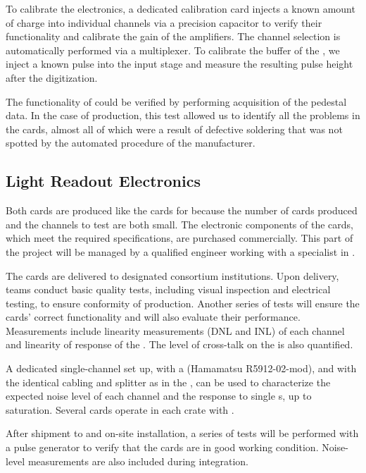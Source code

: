 To calibrate the   electronics, a dedicated calibration card %
injects  a known amount of charge into individual  channels via a precision capacitor to verify their functionality and calibrate the gain of the amplifiers. The channel selection is automatically performed via a multiplexer. To calibrate the  buffer of the  , we inject a known pulse into the input stage and measure the resulting pulse height after the digitization. 



The functionality of  could be verified by performing acquisition of the pedestal data. In the case of  production, this test allowed us to identify all the problems in the cards, almost all of which%
were a result of defective soldering that was not spotted by the automated  procedure of the manufacturer. 


\subsection{Light Readout Electronics}
\label{ssec:dp-tpcelec-prod-lro}

Both   cards are produced like the cards for  because the number of cards produced and the channels to test are both small. The electronic components of the cards, which meet the required specifications, are purchased commercially. This part of the project will be managed by a qualified engineer working with a specialist in .

The cards are delivered to designated consortium institutions. Upon delivery, teams conduct basic quality tests, including visual inspection and electrical testing, to ensure conformity of production. Another series of tests will ensure the cards' %
correct %
functionality and will also evaluate their performance. Measurements include linearity measurements (DNL and INL) of each  channel and linearity of response of the . The level of cross-talk on the  is also quantified. 

A dedicated single-channel set up, with a  (Hamamatsu R5912-02-mod), and with the identical cabling and splitter as in the , 
can be used to characterize the expected noise level of each channel and the response to single \phel{}s, up to saturation. 
Several cards operate in each  crate with . 

After shipment to  and on-site installation, a series of tests will be performed with a pulse generator to verify that the cards are in good working condition. Noise-level measurements are also included during integration.
